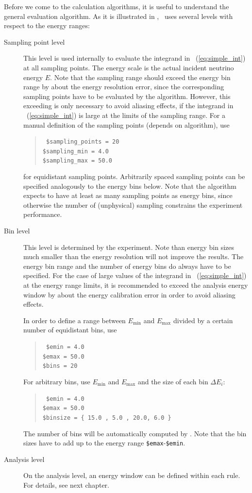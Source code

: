 Before we come to the calculation algorithms, it is useful to understand
the general evaluation algorithm. As it is illustrated in , 
\GLOBES\ uses several levels with respect to the energy ranges:
\begin{description}
\item[Sampling point level]
 This level is used internally to evaluate the integrand in \eq~(\ref{eq:simple_int}) at all sampling points. The energy scale is the actual incident neutrino energy $E$. Note that the sampling range should exceed the energy bin range by about the energy resolution error, since the corresponding sampling points have to be evaluated by the algorithm. 
However, this exceeding is only
necessary to avoid aliasing effects, if the integrand in \eq~(\ref{eq:simple_int}) is large at the limits of the sampling range.
For a manual definition of the sampling points (depends on algorithm), use
\begin{quote}
{\tt
\$sampling\_points = 20\\
\$sampling\_min =          4.0\\
\$sampling\_max =         50.0
}
\end{quote}
for equidistant sampling points. Arbitrarily spaced sampling points can 
be specified analogously to the energy bins below. 
Note that the algorithm expects to 
have at least as many sampling points as energy bins, since otherwise 
the number of (unphysical) sampling constrains the experiment performance.
\item[Bin level] This level is determined by the experiment. Note than energy
bin sizes much smaller than the energy resolution will not improve the results. The energy bin range and the number of energy bins do always have to be specified. For the case of large values of the integrand in \eq~(\ref{eq:simple_int}) at the energy range limits, it is recommended to exceed the analysis energy window by about the energy calibration error in order to avoid aliasing effects.

In order to define a range between $E_\mathrm{min}$
and $E_\mathrm{max}$ divided by a certain number of equidistant bins,
use
\begin{quote}
{\tt
\$emin = 4.0\\
\$emax = 50.0\\
\$bins = 20
}
\end{quote}
For arbitrary bins, use $E_\mathrm{min}$
and $E_\mathrm{max}$ and the size of each bin  $\Delta E_i$:
\begin{quote}
{\tt
\$emin = 4.0\\
\$emax = 50.0\\
\$binsize = \{  15.0 , 5.0 , 20.0, 6.0 \} 
}
\end{quote}
The number of bins will be automatically computed by \GLOBES . Note that the
bin sizes have to add up to the energy range {\tt \$emax}-{\tt \$emin}.
\item[Analysis level]
On the analysis level, an energy window can be defined within each rule. For
details, see next chapter.
\end{description}

